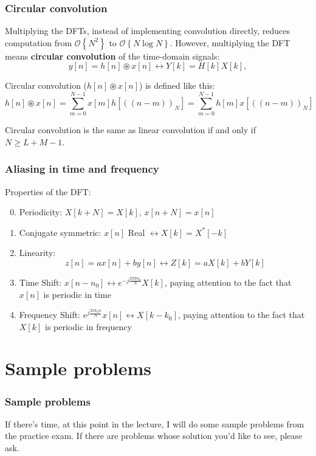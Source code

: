 \documentclass{beamer}
\begin{document}
\begin{frame}
  \frametitle{Circular convolution}

  Multiplying the DFTs, instead of implementing convolution directly,
  reduces computation from $\mathcal{O}\left\{N^2\right\}$ to
  $\mathcal{O}\left\{N\log N\right\}$.
  However, multiplying the
  DFT means {\bf circular convolution} of the time-domain signals:
  \begin{displaymath}
    y[n]=h[n]\circledast x[n] \leftrightarrow Y[k] = H[k]X[k],
  \end{displaymath}
  
  Circular convolution ($h[n]\circledast x[n]$) is defined like this:
  \begin{displaymath}
    h[n]\circledast x[n] = \sum_{m=0}^{N-1}x[m]h\left[(\!(n-m)\!)_N\right]
    = \sum_{m=0}^{N-1}h[m]x\left[(\!(n-m)\!)_N\right]
  \end{displaymath}

  Circular convolution is the same as linear convolution if and only if $N\ge L+M-1$.
\end{frame}

\begin{frame}
  \frametitle{Aliasing in time and frequency}

  Properties of the DFT:

  \begin{enumerate}
    \setcounter{enumi}{-1}
  \item Periodicity: $X[k+N]=X[k]$, $x[n+N]=x[n]$
  \item Conjugate symmetric: $x[n]$ Real $\leftrightarrow X[k]=X^*[-k]$
  \item Linearity:
    \[z[n]=ax[n]+by[n]\leftrightarrow Z[k]=aX[k]+bY[k]
    \]
  \item Time Shift: $x[n-n_0]\leftrightarrow e^{-j\frac{2\pi
      kn_0}{N}}X[k]$, paying attention to the fact that $x[n]$ is
    periodic in time
  \item Frequency Shift: $e^{j\frac{2\pi k_0 n}{N}}x[n]\leftrightarrow
    X[k-k_0]$, paying attention to the fact that $X[k]$ is periodic
    in frequency
  \end{enumerate}
\end{frame}

\section[Sample problems]{Sample problems}
\setcounter{subsection}{1}

\begin{frame}
  \frametitle{Sample problems}

  If there's time, at this point in the lecture, I will do some sample
  problems from the practice exam.  If there are problems whose
  solution you'd like to see, please ask.
\end{frame}
\end{document}
